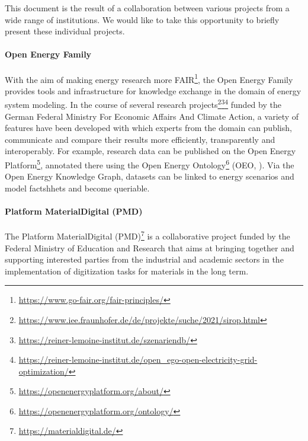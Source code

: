 This document is the result of a collaboration between various projects from a wide range of institutions. We would like to take this opportunity to briefly present these individual projects.

\paragraph{Open Energy Family}

With the aim of making energy research more FAIR\footnote{\url{https://www.go-fair.org/fair-principles/}}, the Open Energy Family provides tools and infrastructure for knowledge exchange in the domain of energy system modeling. In the course of several research projects\footnote{\url{https://www.iee.fraunhofer.de/de/projekte/suche/2021/sirop.html}}\footnote{\url{https://reiner-lemoine-institut.de/szenariendb/}}\footnote{\url{https://reiner-lemoine-institut.de/open_ego-open-electricity-grid-optimization/}} funded by the German Federal Ministry For Economic Affairs And Climate Action, a variety of features have been developed with which experts from the domain can publish, communicate and compare their results more efficiently, transparently and interoperably. For example, research data can be published on the Open Energy Platform\footnote{\url{https://openenergyplatform.org/about/}}, annotated there using the Open Energy Ontology\footnote{\url{https://openenergyplatform.org/ontology/}} (OEO, \cite{oeo2021}). Via the Open Energy Knowledge Graph, datasets can be linked to energy scenarios and model factshhets and become queriable.

\paragraph{Platform MaterialDigital (PMD)}

The Platform MaterialDigital (PMD)\footnote{\url{https://materialdigital.de/}} is a collaborative project funded by the Federal Ministry of Education and Research that aims at bringing together and supporting interested parties from the industrial and academic sectors in the implementation of digitization tasks for materials in the long term.

